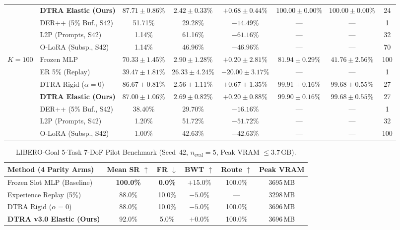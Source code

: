\documentclass[10pt]{article}
\begin{document}
\begin{table}[ht!]
\begin{tabular}{llcccccc}
     & \textbf{DTRA Elastic (Ours)} & $\mathbf{87.71 \pm 0.86}$\% & $2.42 \pm 0.33$\% & $+0.68 \pm 0.44$\% & $\mathbf{100.00 \pm 0.00}$\% & $\mathbf{100.00 \pm 0.00}$\% & 24 \\
    & DER++ (5\% Buf., S42) & 51.71\% & 29.28\% & $-14.49$\% & --- & --- & 1 \\
    & L2P (Prompts, S42) & 1.14\% & 61.16\% & $-61.16$\% & --- & --- & 32 \\
    & O-LoRA (Subsp., S42) & 1.14\% & 46.96\% & $-46.96$\% & --- & --- & 70 \\
    \midrule
    $K=100$ & Frozen MLP & $70.33 \pm 1.45$\% & $2.90 \pm 1.28$\% & $+0.20 \pm 2.81$\% & $81.94 \pm 0.29$\% & $41.76 \pm 2.56$\% & 100 \\
     & ER 5\% (Replay) & $39.47 \pm 1.81$\% & $26.33 \pm 4.24$\% & $-20.00 \pm 3.17$\% & --- & --- & 1 \\
     & DTRA Rigid ($\alpha=0$) & $86.67 \pm 0.81$\% & $2.56 \pm 1.11$\% & $+0.67 \pm 1.35$\% & $\mathbf{99.91 \pm 0.16}$\% & $\mathbf{99.68 \pm 0.55}$\% & 27 \\
     & \textbf{DTRA Elastic (Ours)} & $\mathbf{87.00 \pm 1.06}$\% & $2.69 \pm 0.82$\% & $+0.20 \pm 0.88$\% & $99.90 \pm 0.16$\% & $\mathbf{99.68 \pm 0.55}$\% & 27 \\
    & DER++ (5\% Buf., S42) & 38.40\% & 29.70\% & $-16.16$\% & --- & --- & 1 \\
    & L2P (Prompts, S42) & 1.20\% & 51.72\% & $-51.72$\% & --- & --- & 32 \\
    & O-LoRA (Subsp., S42) & 1.00\% & 42.63\% & $-42.63$\% & --- & --- & 100 \\
    \bottomrule
  \end{tabular}
\end{table}



\begin{table}[ht!]
  \centering
  \caption{LIBERO-Goal 5-Task 7-DoF Pilot Benchmark (Seed~42, $n_{\text{eval}}=5$, Peak VRAM $\le 3.7$\,GB).}
  \label{tab:libero_goal_pilot}
  \small
  \setlength{\tabcolsep}{5pt}
  \begin{tabular}{lccccc}
    \toprule
    \textbf{Method (4 Parity Arms)} & \textbf{Mean SR $\uparrow$} & \textbf{FR $\downarrow$} & \textbf{BWT $\uparrow$} & \textbf{Route $\uparrow$} & \textbf{Peak VRAM} \\
    \midrule
    Frozen Slot MLP (Baseline) & \textbf{100.0\%} & \textbf{0.0\%} & $\mathbf{+15.0}$\% & 100.0\% & 3695\,MB \\
    Experience Replay (5\%) & 88.0\% & 10.0\% & $-5.0$\% & --- & 3298\,MB \\
    DTRA Rigid ($\alpha=0$) & 88.0\% & 10.0\% & $-5.0$\% & 100.0\% & 3696\,MB \\
    \textbf{DTRA v3.0 Elastic (Ours)} & 92.0\% & 5.0\% & $+0.0$\% & 100.0\% & 3696\,MB \\
    \bottomrule
  \end{tabular}
\end{table}
\end{document}
